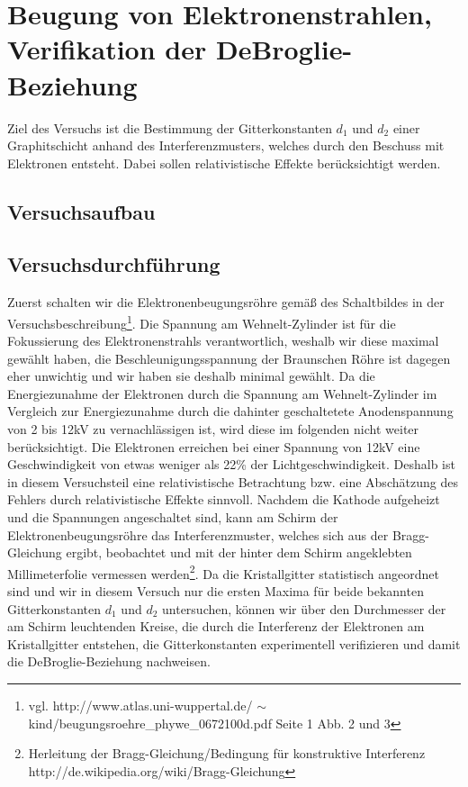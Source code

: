 \documentclass[12pt,a4paper]{article}
\begin{document}
\section{Beugung von Elektronenstrahlen, Verifikation der DeBroglie-Beziehung}
Ziel des Versuchs ist die Bestimmung der Gitterkonstanten $d_1$ und $d_2$ einer Graphitschicht anhand des Interferenzmusters, welches durch den Beschuss mit Elektronen entsteht. Dabei sollen relativistische Effekte berücksichtigt werden.
\subsection{Versuchsaufbau}
\subsection{Versuchsdurchführung}
Zuerst schalten wir die Elektronenbeugungsröhre gemäß des Schaltbildes in der Versuchsbeschreibung\footnote{vgl. http://www.atlas.uni-wuppertal.de/
$\sim$kind/beugungsroehre\_phywe\_0672100d.pdf Seite 1 Abb. 2 und 3}. Die Spannung am Wehnelt-Zylinder ist für die Fokussierung des Elektronenstrahls verantwortlich, weshalb wir diese maximal gewählt haben, die Beschleunigungsspannung der Braunschen Röhre ist dagegen eher unwichtig und wir haben sie deshalb minimal gewählt. Da die Energiezunahme der Elektronen durch die Spannung am Wehnelt-Zylinder im Vergleich zur Energiezunahme durch die dahinter geschaltetete Anodenspannung von 2 bis 12kV zu vernachlässigen ist, wird diese im folgenden nicht weiter berücksichtigt. Die Elektronen erreichen bei einer Spannung von 12kV eine Geschwindigkeit von etwas weniger als 22\% der Lichtgeschwindigkeit. Deshalb ist in diesem Versuchsteil eine relativistische Betrachtung bzw. eine Abschätzung des Fehlers durch relativistische Effekte sinnvoll. Nachdem die Kathode aufgeheizt und die Spannungen angeschaltet sind, kann am Schirm der Elektronenbeugungsröhre das Interferenzmuster, welches sich aus der Bragg-Gleichung ergibt, beobachtet und mit der hinter dem Schirm angeklebten Millimeterfolie vermessen werden\footnote{Herleitung der Bragg-Gleichung/Bedingung für konstruktive Interferenz http://de.wikipedia.org/wiki/Bragg-Gleichung}.
Da die Kristallgitter statistisch angeordnet sind und wir in diesem Versuch nur die ersten Maxima für beide bekannten Gitterkonstanten $d_1$ und $d_2$ untersuchen, können wir über den Durchmesser der am Schirm leuchtenden Kreise, die durch die Interferenz der Elektronen am Kristallgitter entstehen, die Gitterkonstanten experimentell verifizieren und damit die DeBroglie-Beziehung nachweisen.
\end{document}
